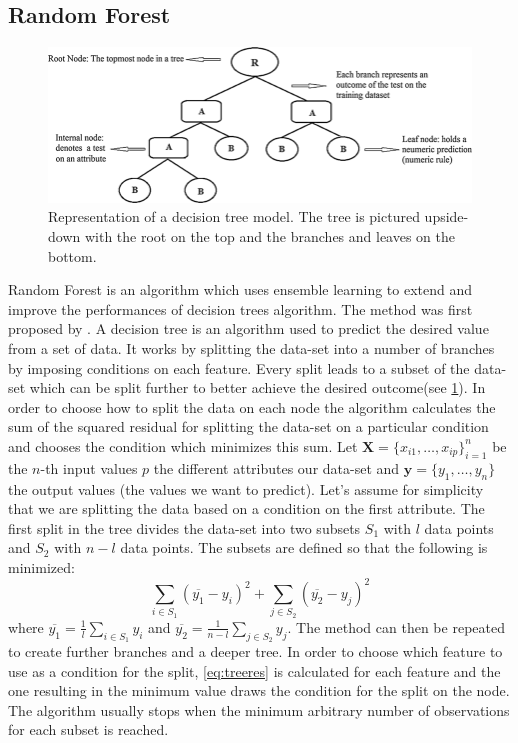 \subsection{Random Forest}
\begin{figure}[!tp]
	\centering		  
	\includegraphics[width=1.\textwidth]{figures/decision_tree.png}
	\caption{Representation of a decision tree model. The tree is pictured upside-down with the root on the top and the branches and leaves on the bottom.}
	\label{fig:tree}
\end{figure}
Random Forest is an algorithm which uses ensemble learning to extend and improve the performances of decision trees algorithm. The method was first proposed by \citet{RandomHo1995}. A decision tree is an algorithm used to predict the desired value from a set of data. It works by splitting the data-set into a number of branches by imposing conditions on each feature. Every split leads to a subset of the data-set which can be split further to better achieve the desired outcome(see \ref{fig:tree}). In order to choose how to split the data on each node the algorithm calculates the sum of the squared residual for splitting the data-set on a particular condition and chooses the condition which minimizes this sum. Let $\bm{X} = \{x_{i1},\ldots ,x_{ip}\}_{i=1}^{n}$ be the $n$-th input values $p$ the different attributes  our data-set and $\mathbf{y} = \{y_{1},\ldots ,y_{n}\}$ the output values (the values we want to predict). Let's assume for simplicity that we are splitting the data based on a condition on the first attribute. The first split in the tree divides the data-set into two subsets $S_1$ with $l$ data points and $S_2$ with $n-l$ data points. The subsets are defined so that the following is minimized:
\begin{equation}\label{eq:treeres}
\sum_{i \in S_1}(\overline{y_1}-y_i)^2 + \sum_{j \in S_2}(\overline{y_2}-y_j)^2
\end{equation}
where  $\overline{y_1} = \frac{1}{l}\sum_{i \in S_1}y_i$ and $\overline{y_2} = \frac{1}{n-l}\sum_{j \in S_2}y_j$. The method can then be repeated to create further branches and a deeper tree. In order to choose which feature to use as a condition for the split, \ref{eq:treeres} is calculated for each feature and the one resulting in the minimum value draws the condition for the split on the node. The algorithm usually stops when the minimum arbitrary number of observations for each subset is reached.

